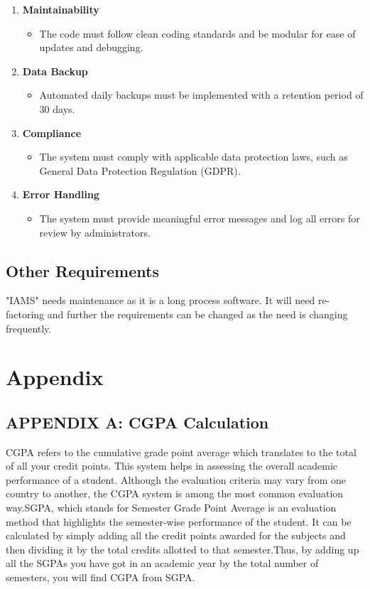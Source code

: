 \documentclass{scrreprt}
\begin{document}
\begin{enumerate}
    \item \textbf{Maintainability}
    \begin{itemize}
        \item The code must follow clean coding standards and be modular for ease of updates and debugging.
    \end{itemize}

    \item \textbf{Data Backup}
    \begin{itemize}
        \item Automated daily backups must be implemented with a retention period of 30 days.
    \end{itemize}

    \item \textbf{Compliance}
    \begin{itemize}
        \item The system must comply with applicable data protection laws, such as General Data Protection Regulation (GDPR).
    \end{itemize}

    \item \textbf{Error Handling}
    \begin{itemize}
        \item The system must provide meaningful error messages and log all errors for review by administrators.
    \end{itemize}
\end{enumerate}


\section{Other Requirements}
"IAMS" needs maintenance as it is a long process software. It will need re-factoring and further the requirements can be changed as the need is changing frequently. 

\chapter{Appendix}
\section{APPENDIX A: CGPA Calculation}
CGPA refers to the cumulative grade point average which translates to the total of all your credit points. This system helps in assessing the overall academic performance of a student. Although the evaluation criteria may vary from one country to another, the CGPA system is among the most common evaluation way.SGPA, which stands for Semester Grade Point Average is an evaluation method that highlights the semester-wise performance of the student. It can be calculated by simply adding all the credit points awarded for the subjects and then dividing it by the total credits allotted to that semester.Thus, by adding up all the SGPAs you have got in an academic year by the total number of semesters, you will find CGPA from SGPA.
\end{document}
